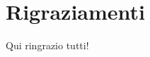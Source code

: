\clearpage{\pagestyle{empty}\cleardoublepage}
\chapter*{Rigraziamenti}
\fancyhf{} %
\addtolength{\parskip}{- 5pt}

Qui ringrazio tutti!